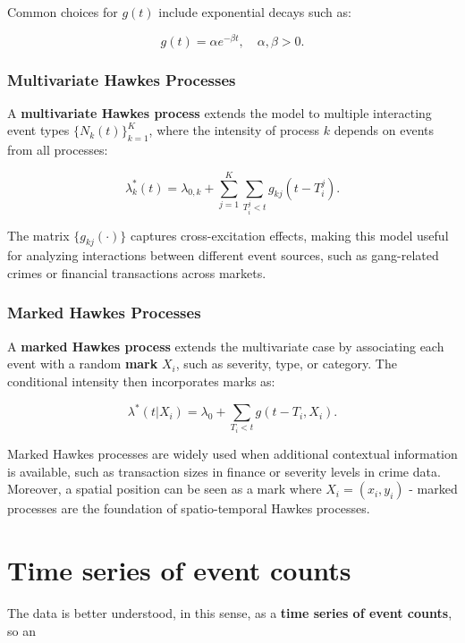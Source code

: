 \documentclass[11pt]{article}
\begin{document}
Common choices for $g(t)$ include exponential decays such as:

\[
  g(t) = \alpha e^{-\beta t}, \quad \alpha, \beta > 0.
\]

\subsubsection{Multivariate Hawkes Processes}

A \textbf{multivariate Hawkes process} extends the model to multiple interacting event types $\{N_k(t)\}_{k=1}^{K}$, where the intensity of process $k$ depends on events from all processes:

\[
  \lambda_k^*(t) = \lambda_{0,k} + \sum_{j=1}^{K} \sum_{T_i^j < t} g_{kj}(t - T_i^j).
\]

The matrix $\{g_{kj}(\cdot)\}$ captures cross-excitation effects, making this model useful for analyzing interactions between different event sources, such as gang-related crimes or financial transactions across markets.

\subsubsection{Marked Hawkes Processes}

A \textbf{marked Hawkes process} extends the multivariate case by associating each event with a random \textbf{mark} $X_i$, such as severity, type, or category. The conditional intensity then incorporates marks as:

\[
  \lambda^*(t | X_i) = \lambda_0 + \sum_{T_i < t} g(t - T_i, X_i).
\]

Marked Hawkes processes are widely used when additional contextual information is available, such as transaction sizes in finance or severity levels in crime data. Moreover, a spatial position can be seen as a mark where $X_i = (x_i,y_i)$ - marked processes are the foundation of spatio-temporal Hawkes processes.

\section{Time series of event counts}

The data is better understood, in this sense, as a \textbf{time series of event counts}, so an

\nocite{*}

\end{document}
